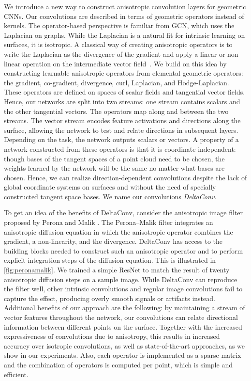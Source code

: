 \documentclass[acmtog, authorversion]{acmart}
\begin{document}
We introduce a new way to construct anisotropic convolution layers for geometric CNNs. Our convolutions are described in terms of geometric operators instead of kernels. The operator-based perspective is familiar from GCN, which uses the Laplacian on graphs. While the Laplacian is a natural fit for intrinsic learning on surfaces, it is isotropic. A classical way of creating anisotropic operators is to write the Laplacian as the divergence of the gradient and apply a linear or non-linear operation on the intermediate vector field~\cite{weickert1998anisotropic}. We build on this idea by constructing learnable anisotropic operators from elemental geometric operators: the gradient, co-gradient, divergence, curl, Laplacian, and Hodge-Laplacian. These operators are defined on spaces of scalar fields and tangential vector fields. Hence, our networks are split into two streams: one stream contains scalars and the other tangential vectors. The operators map along and between the two streams. The vector stream encodes feature activations and directions along the surface, allowing the network to test and relate directions in subsequent layers. Depending on the task, the network outputs scalars or vectors.
A property of a network constructed from these operators is that it is coordinate-independent: though bases of the tangent spaces of a point cloud need to be chosen, the weights learned by the network will be the same no matter what bases are chosen. 
Hence, we can realize direction-dependent convolutions despite the lack of global coordinate systems on surfaces and without the need of specially constructed tangent space bases. We name our convolutions \textit{DeltaConv}.

To get an idea of the benefits of DeltaConv, consider the anisotropic image filter proposed by Perona and Malik . The Perona--Malik filter integrates an anisotropic diffusion equation in which the anisotropic operator combines the gradient, a non-linearity, and the divergence. 
DeltaConv has access to the building blocks needed to construct such an anisotropic operator and to perform explicit integration steps of the diffusion equation.
This is illustrated in \autoref{fig:peronamalik}. We trained a simple ResNet \cite{he2016deep} to match the result of twenty anisotropic diffusion steps on a sample image. While DeltaConv can reproduce the filter well, other intrinsic convolutions and regular image convolutions fail to capture the effect, producing overly smooth signals or artifacts instead.
Additional benefits of our approach are the following: by maintaining a stream of vector features throughout the network, our convolutions can relate directional information between different points on the surface. Together with the increased expressiveness of convolutions due to anisotropy, this results in increased accuracy over isotropic convolutions, as well as state-of-the-art approaches, as we show in our experiments. Also, each operator is implemented as a sparse matrix and the combination of operators is computed per point, which is simple and efficient. 
\end{document}
